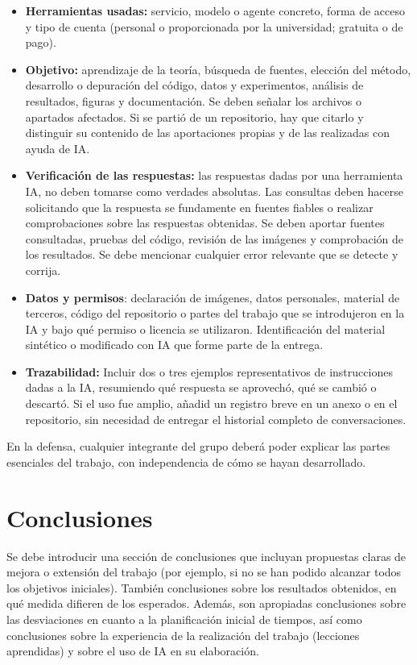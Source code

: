 \documentclass[a4paper]{article}
\begin{document}
\begin{itemize}
    \item \textbf{Herramientas usadas:} servicio, modelo o agente concreto, forma de acceso y tipo de cuenta (personal o proporcionada por la universidad; gratuita o de pago).
    \item \textbf{Objetivo:} aprendizaje de la teoría, búsqueda de fuentes, elección del método, desarrollo o depuración del código, datos y experimentos, análisis de resultados, figuras y documentación. Se deben señalar los archivos o apartados afectados. Si se partió de un repositorio, hay que citarlo y distinguir su contenido de las aportaciones propias y de las realizadas con ayuda de IA.
    \item \textbf{Verificación de las respuestas:} las respuestas dadas por una herramienta IA, no deben tomarse como verdades absolutas. Las consultas deben hacerse solicitando que la respuesta se fundamente en fuentes fiables o realizar comprobaciones sobre las respuestas obtenidas. Se deben aportar fuentes consultadas, pruebas del código, revisión de las imágenes y comprobación de los resultados. Se debe mencionar cualquier error relevante que se detecte y corrija.
    \item \textbf{Datos y permisos}: declaración de imágenes, datos personales, material de terceros, código del repositorio o partes del trabajo que se introdujeron en la IA y bajo qué permiso o licencia se utilizaron. Identificación  del material sintético o modificado con IA que forme parte de la entrega.
    \item \textbf{Trazabilidad:} Incluir dos o tres ejemplos representativos de instrucciones dadas a la IA, resumiendo qué respuesta se aprovechó, qué se cambió o descartó. Si el uso fue amplio, añadid un registro breve en un anexo o en el repositorio, sin necesidad de entregar el historial completo de conversaciones.
\end{itemize}


 En la defensa, cualquier integrante del grupo deberá poder explicar las partes esenciales del trabajo, con independencia de cómo se hayan desarrollado.

\section{Conclusiones}

Se debe introducir una sección de conclusiones que incluyan propuestas claras de mejora o extensión del trabajo (por ejemplo, si no se han podido alcanzar todos los objetivos iniciales). También conclusiones sobre los resultados obtenidos, en qué medida difieren de los esperados. Además, son apropiadas conclusiones sobre las desviaciones en cuanto a la planificación inicial de tiempos, así como conclusiones sobre la experiencia de la realización del trabajo (lecciones aprendidas) y sobre el uso de IA en su elaboración.
\end{document}
